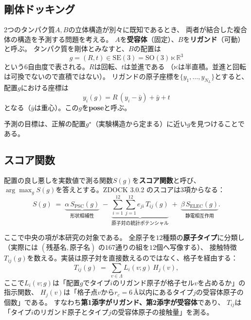 \documentclass[11pt,a4paper]{article}
\newcommand{\R}{\mathbb{R}}
\newcommand{\SOthree}{\mathrm{SO}(3)}
\begin{document}
\subsection{剛体ドッキング}

2つのタンパク質$A, B$の立体構造が別々に既知であるとき、
両者が結合した複合体の構造を予測する問題を考える。
$A$を\textbf{受容体}（固定）、$B$を\textbf{リガンド}（可動）と呼ぶ。
タンパク質を剛体とみなすと、$B$の配置は
\begin{equation}
  g = (R, t) \in \mathrm{SE}(3) = \SOthree \ltimes \R^3
\end{equation}
という$6$自由度で表される。$R$は回転、$t$は並進である
（$\ltimes$は半直積。並進と回転は可換でないので直積ではない）。
リガンドの原子座標を$\{y_1,\dots,y_{N_L}\}$とすると、配置$g$における座標は
\begin{equation}
  y_i(g) = R\,(y_i - \bar y) + \bar y + t
\end{equation}
となる（$\bar y$は重心）。この$g$を\textbf{pose}と呼ぶ。

予測の目標は、正解の配置$g^\star$（実験構造から定まる）に近い$g$を見つけることである。

\subsection{スコア関数}

配置の良し悪しを実数値で測る関数$S(g)$を\textbf{スコア関数}と呼び、
$\arg\max_g S(g)$を答えとする。ZDOCK 3.0.2 のスコアは3項からなる：
\begin{equation}
  S(g) \;=\; \underbrace{\alpha\,S_{\mathrm{PSC}}(g)}_{\text{形状相補性}}
        \;-\; \underbrace{\sum_{i=1}^{12}\sum_{j=1}^{12} e_{ji}\,T_{ij}(g)}_{\text{原子対の統計ポテンシャル}}
        \;+\; \underbrace{\beta\,S_{\mathrm{ELEC}}(g)}_{\text{静電相互作用}} .
  \label{eq:score}
\end{equation}

ここで中央の項が本研究の対象である。
全原子を$12$種類の\textbf{原子タイプ}に分類し
（実際には $(\text{残基名},\text{原子名})$ の$167$通りの組を$12$個へ写像する）、
接触特徴$T_{ij}(g)$を数える。実装は原子対を直接数えるのではなく、格子を経由する：
\begin{equation}
  T_{ij}(g) \;=\; \sum_{v \in \Lambda} L_i(v; g)\, H_j(v),
  \label{eq:tij}
\end{equation}
ここで$L_i(v;g)$は「配置$g$でタイプ$i$のリガンド原子が格子セル$v$を占めるか」の指示関数、
$H_j(v)$は「格子点$v$から$r_c = 6$\,\AA{}以内にあるタイプ$j$の受容体原子の個数」である。
すなわち\textbf{第1添字がリガンド、第2添字が受容体}であり、
$T_{ij}$は「タイプ$i$のリガンド原子とタイプ$j$の受容体原子の接触量」を測る。
\end{document}
